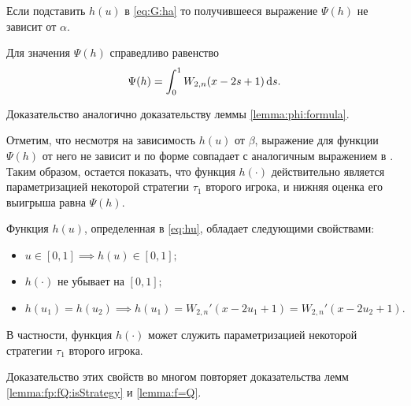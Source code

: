 Если подставить $h(u)$ в \eqref{eq:G:ha} то получившееся выражение $\Psi(h)$ не
зависит от $\alpha$.

\begin{lemma}
  Для значения $\Psi(h)$ справедливо равенство
  \begin{equation}\label{eq:Psi:value}
    \Psi(h) = \int_0^1 W_{2,n}(x - 2s + 1) \mathop{}\!\mathrm{d} s.
  \end{equation}
\end{lemma}
Доказательство аналогично доказательству леммы \ref{lemma:phi:formula}.

Отметим, что несмотря на зависимость $h(u)$ от $\beta$, выражение для функции
$\Psi(h)$ от него не зависит и по форме совпадает с аналогичным выражением в
\cite{demeyer02}. Таким образом, остается показать, что функция $h(\cdot)$
действительно является параметризацией некоторой стратегии $\tau_1$ второго
игрока, и нижняя оценка его выигрыша равна $\Psi(h)$.

\begin{lemma}\label{lemma:hu:props}
  Функция $h(u)$, определенная в \eqref{eq:hu}, обладает следующими свойствами:
  \begin{itemize}
  \item $u \in [0, 1] \implies h(u) \in [0, 1];$
  \item $h(\cdot)$ не убывает на $[0, 1];$
  \item $ h(u_1) = h(u_2) \implies h(u_1) = W_{2,n}'(x - 2u_1 + 1) = W_{2,n}'(x
    - 2u_2 + 1). $
  \end{itemize}
  В частности, функция $h(\cdot)$ может служить параметризацией некоторой
  стратегии $\tau_1$ второго игрока.
\end{lemma}
Доказательство этих свойств во многом повторяет доказательства лемм
\ref{lemma:fp:fQ:isStrategy} и \ref{lemma:f=Q}.


